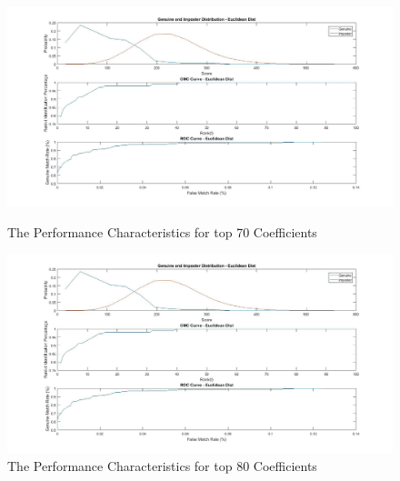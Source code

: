 \documentclass[conference]{IEEEtran}
\begin{document}
\begin{enumerate}
\begin{figure}
\centering
\includegraphics[width=20cm]{forTop70Coefficients.jpg}
\caption{The Performance Characteristics for top 70 Coefficients}
\label{top70Coef}
\includegraphics[width=20cm]{forTop80Coeffecients.jpg}
\caption{The Performance Characteristics for top 80 Coefficients}
\label{top80Coef}
\end{figure}


\end{enumerate}
\end{document}
